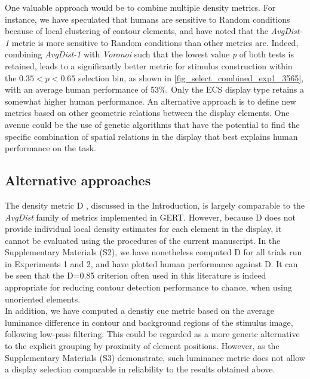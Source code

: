 \documentclass[12pt]{article}
\begin{document}
One valuable approach would be to combine multiple density metrics. For instance, we have speculated that humans are sensitive to Random conditions because of local clustering of contour elements, and have noted that the \emph{AvgDist-1} metric is more sensitive to Random conditions than other metrics are. Indeed, combining \emph{AvgDist-1} with \emph{Voronoi} such that the lowest value \emph{p} of both tests is retained, leads to a significantly better metric for stimulus construction within the $0.35<p<0.65$ selection bin, as shown in \autoref{fig_select_combined_exp1_3565}, with an average human performance of 53\%. Only the ECS display type retains a somewhat higher human performance. An alternative approach is to define new metrics based on other geometric relations between the display elements. One avenue could be the use of genetic algorithms that have the potential to find the specific combination of spatial relations in the display that best explains human performance on the task.

\subsection{Alternative approaches}\label{subsection_discussion_alternative}

The density metric D \cite{Kovacs93,Kovacs94,Kovacs99,Kovacs00}, discussed in the Introduction, is largely comparable to the \emph{AvgDist} family of metrics implemented in GERT. However, because D does not provide individual local density estimates for each element in the display, it cannot be evaluated using the procedures of the current manuscript. In the Supplementary Materials (S2), we have nonetheless computed D for all trials run in Experiments 1 and 2, and have plotted human performance against D. It can be seen that the D=0.85 criterion often used in this literature is indeed appropriate for reducing contour detection performance to chance, when using unoriented elements.\\

In addition, we have computed a denstiy cue metric based on the average luminance difference in contour and background regions of the stimulus image, following low-pass filtering. This could be regarded as a more generic alternative to the explicit grouping by proximity of element positions. However, as the Supplementary Materials (S3) demonstrate, such luminance metric does not allow a display selection comparable in reliability to the results obtained above.\\
\end{document}
